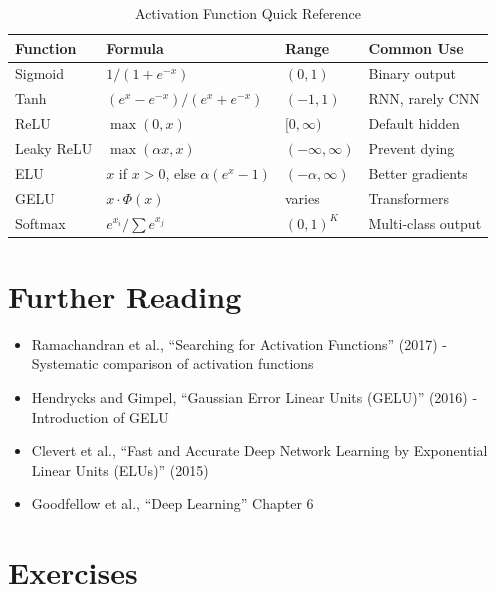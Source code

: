 \begin{table}[h]
    \centering
    \caption{Activation Function Quick Reference}
    \begin{tabular}{L{2.5cm} L{2.5cm} L{2cm} L{3cm}}
        \toprule
        \textbf{Function} & \textbf{Formula} & \textbf{Range} & \textbf{Common Use} \\
        \midrule
        Sigmoid & $1/(1+e^{-x})$ & $(0,1)$ & Binary output \\
        Tanh & $(e^x-e^{-x})/(e^x+e^{-x})$ & $(-1,1)$ & RNN, rarely CNN \\
        ReLU & $\max(0,x)$ & $[0,\infty)$ & Default hidden \\
        Leaky ReLU & $\max(\alpha x, x)$ & $(-\infty,\infty)$ & Prevent dying \\
        ELU & $x$ if $x>0$, else $\alpha(e^x-1)$ & $(-\alpha,\infty)$ & Better gradients \\
        GELU & $x \cdot \Phi(x)$ & varies & Transformers \\
        Softmax & $e^{x_i}/\sum e^{x_j}$ & $(0,1)^K$ & Multi-class output \\
        \bottomrule
    \end{tabular}
\end{table}

\section{Further Reading}

\begin{itemize}
    \item Ramachandran et al., ``Searching for Activation Functions'' (2017) - Systematic comparison of activation functions
    \item Hendrycks and Gimpel, ``Gaussian Error Linear Units (GELU)'' (2016) - Introduction of GELU
    \item Clevert et al., ``Fast and Accurate Deep Network Learning by Exponential Linear Units (ELUs)'' (2015)
    \item Goodfellow et al., ``Deep Learning'' Chapter 6
\end{itemize}

\section{Exercises}

